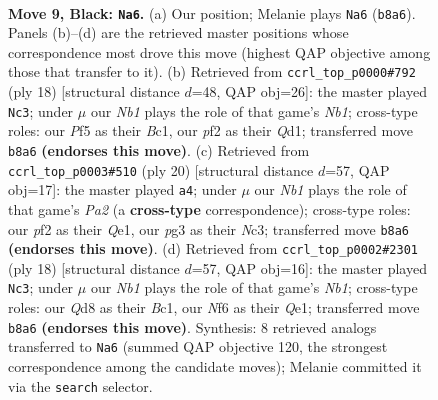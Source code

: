 \documentclass[11pt]{article}
\begin{document}
\clearpage

\begin{figure}[p]\centering
\begin{subfigure}{0.46\textwidth}\centering
\resizebox{\linewidth}{!}{%
\newchessgame
\chessboard[
  setfen={rnbq1rk1/pp4pp/2pb1n2/3p1p2/3P4/5NP1/PP1NPPBP/R1BQR1K1 b - - 3 9},
  showmover=false,
  pgfstyle=straightmove, color=movearrow, markmove={b8-a6}
]}
\caption{}
\end{subfigure}\hfill
\begin{subfigure}{0.46\textwidth}\centering
\resizebox{\linewidth}{!}{%
\newchessgame
\chessboard[
  setfen={r1bq1rk1/pp1n1pbp/3p1np1/2pP4/2P5/3B1N1P/PP3PP1/RNBQ1RK1 w - - 1 10},
  showmover=false,
  pgfstyle=straightmove, color=movearrow, markmove={b1-c3}
]}
\caption{}
\end{subfigure}
\\[4pt]
\begin{subfigure}{0.46\textwidth}\centering
\resizebox{\linewidth}{!}{%
\newchessgame
\chessboard[
  setfen={r1b2rk1/1pqnppbp/p2p1np1/8/4PP2/2NB1N2/PPP3PP/R1B1QRK1 w - - 6 11},
  showmover=false,
  pgfstyle=straightmove, color=movearrow, markmove={a2-a4}
]}
\caption{}
\end{subfigure}\hfill
\begin{subfigure}{0.46\textwidth}\centering
\resizebox{\linewidth}{!}{%
\newchessgame
\chessboard[
  setfen={r1bq1rk1/pp1n1pbp/2p2np1/4p3/4PP2/5NP1/PPP3BP/RNB1QRK1 w - - 0 10},
  showmover=false,
  pgfstyle=straightmove, color=movearrow, markmove={b1-c3}
]}
\caption{}
\end{subfigure}
\caption{\textbf{Move 9, Black: \texttt{Na6}.} (a) Our position; Melanie plays \texttt{Na6} (\texttt{b8a6}). Panels (b)--(d) are the retrieved master positions whose correspondence most drove this move (highest QAP objective among those that transfer to it). (b) Retrieved from \texttt{ccrl\_top\_p0000\#792} (ply 18) [structural distance $d$=48, QAP obj=26]: the master played \texttt{Nc3}; under $\mu$ our \emph{Nb1} plays the role of that game's \emph{Nb1}; cross-type roles: our \emph{P}f5 as their \emph{B}c1, our \emph{p}f2 as their \emph{Q}d1; transferred move \texttt{b8a6} \textbf{(endorses this move)}. (c) Retrieved from \texttt{ccrl\_top\_p0003\#510} (ply 20) [structural distance $d$=57, QAP obj=17]: the master played \texttt{a4}; under $\mu$ our \emph{Nb1} plays the role of that game's \emph{Pa2} (a \textbf{cross-type} correspondence); cross-type roles: our \emph{p}f2 as their \emph{Q}e1, our \emph{p}g3 as their \emph{N}c3; transferred move \texttt{b8a6} \textbf{(endorses this move)}. (d) Retrieved from \texttt{ccrl\_top\_p0002\#2301} (ply 18) [structural distance $d$=57, QAP obj=16]: the master played \texttt{Nc3}; under $\mu$ our \emph{Nb1} plays the role of that game's \emph{Nb1}; cross-type roles: our \emph{Q}d8 as their \emph{B}c1, our \emph{N}f6 as their \emph{Q}e1; transferred move \texttt{b8a6} \textbf{(endorses this move)}. Synthesis: 8 retrieved analogs transferred to \texttt{Na6} (summed QAP objective 120, the strongest correspondence among the candidate moves); Melanie committed it via the \texttt{search} selector.}
\label{fig:thought-m17}
\end{figure}
\end{document}
